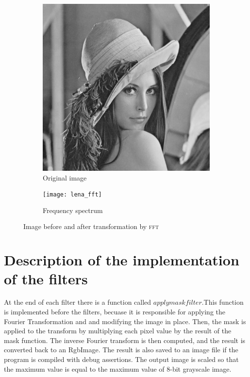 \documentclass[12pt]{article}
\newcommand*{\fft}{\textsc{fft}}
\begin{document}
\begin{figure}[H]\centering
    \begin{subfigure}[ht]{.4\textwidth}\centering
        \includegraphics[width=\textwidth]{lena}
        \caption{Original image}
    \end{subfigure}
    \hspace*{2em}
    \begin{subfigure}[ht]{.4\textwidth}\centering
        \texttt{[image: lena\_fft]}
        \caption{Frequency spectrum}
    \end{subfigure}
    \caption{Image before and after transformation by \fft}
\end{figure}

\section{Description of the implementation of the filters}
At the end of each filter there is a function called $apply mask filter$.This function is implemented before the filters, becuase it is responsible for applying the Fourier Transformation and and modifying the image in place. Then, the mask is applied to the transform by multiplying each pixel value by the result of the mask function. The inverse Fourier transform is then computed, and the result is converted back to an RgbImage. The result is also saved to an image file if the program is compiled with debug assertions. The output image is scaled so that the maximum value is equal to the maximum value of 8-bit grayscale image.
\end{document}
